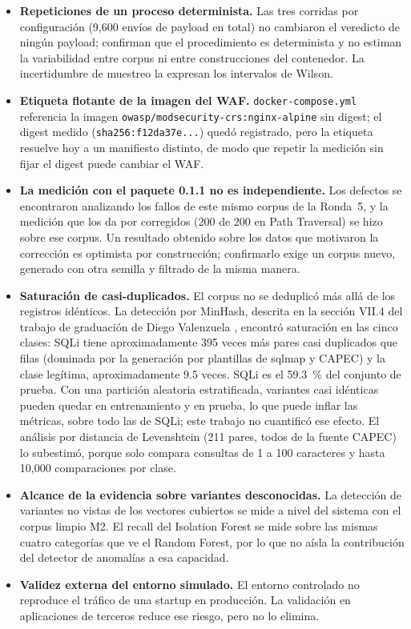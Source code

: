 \begin{itemize}
    \item \textbf{Repeticiones de un proceso determinista.} Las tres corridas por configuración
    (9{,}600 envíos de payload en total) no cambiaron el veredicto de ningún payload; confirman que
    el procedimiento es determinista y no estiman la variabilidad entre corpus ni entre
    construcciones del contenedor. La incertidumbre de muestreo la expresan los intervalos de
    Wilson.
    \item \textbf{Etiqueta flotante de la imagen del WAF.} \texttt{docker-compose.yml} referencia la
    imagen \texttt{owasp/modsecurity-crs:nginx-alpine} sin digest; el digest medido
    (\texttt{sha256:f12da37e...}) quedó registrado, pero la etiqueta resuelve hoy a un manifiesto
    distinto, de modo que repetir la medición sin fijar el digest puede cambiar el WAF.
    \item \textbf{La medición con el paquete 0.1.1 no es independiente.} Los defectos se
    encontraron analizando los fallos de este mismo corpus de la Ronda~5, y la medición que los da
    por corregidos (200 de 200 en Path Traversal) se hizo sobre ese corpus. Un resultado obtenido
    sobre los datos que motivaron la corrección es optimista por construcción; confirmarlo exige un
    corpus nuevo, generado con otra semilla y filtrado de la misma manera.
    \item \textbf{Saturación de casi-duplicados.} El corpus no se deduplicó más allá de los
    registros idénticos. La detección por MinHash, descrita en la sección VII.4 del trabajo de
    graduación de Diego Valenzuela \cite{valenzuela2026ia}, encontró saturación en las cinco clases: SQLi tiene
    aproximadamente 395 veces más pares casi duplicados que filas (dominada por la generación por
    plantillas de sqlmap y CAPEC) y la clase legítima, aproximadamente 9.5 veces. SQLi es el
    59.3~\% del conjunto de prueba. Con una partición aleatoria estratificada, variantes casi
    idénticas pueden quedar en entrenamiento y en prueba, lo que puede inflar las métricas, sobre
    todo las de SQLi; este trabajo no cuantificó ese efecto. El análisis por distancia de
    Levenshtein (211 pares, todos de la fuente CAPEC) lo subestimó, porque solo compara consultas de
    1 a 100 caracteres y hasta 10{,}000 comparaciones por clase.
    \item \textbf{Alcance de la evidencia sobre variantes desconocidas.} La detección de
    variantes no vistas de los vectores cubiertos se mide a nivel del sistema con el corpus limpio
    M2. El recall del Isolation Forest se mide sobre las mismas cuatro categorías que ve el Random
    Forest, por lo que no aísla la contribución del detector de anomalías a esa capacidad.
    \item \textbf{Validez externa del entorno simulado.} El entorno controlado no reproduce el
    tráfico de una startup en producción. La validación en aplicaciones de terceros reduce ese
    riesgo, pero no lo elimina.
\end{itemize}

